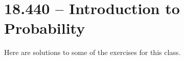 \section{18.440 -- Introduction to Probability}
Here are solutions to some of the exercises for this class.

